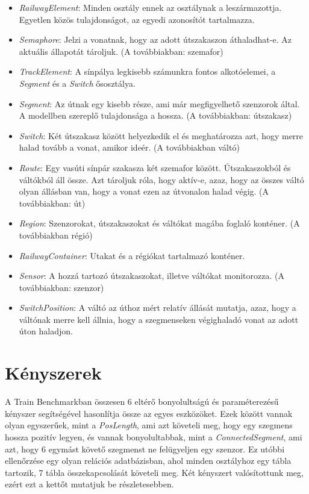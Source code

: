 \begin{itemize}
	\item \emph{RailwayElement}: Minden osztály ennek az osztálynak a leszármazottja. Egyetlen közös tulajdonságot, az egyedi azonosítót tartalmazza.
	\item \emph{Semaphore}: Jelzi a vonatnak, hogy az adott útszakaszon áthaladhat-e. Az aktuális állapotát tároljuk. (A továbbiakban: szemafor)
	\item \emph{TrackElement}: A sínpálya legkisebb számunkra fontos alkotóelemei, a \emph{Segment} és a \emph{Switch} ősosztálya.
	\item \emph{Segment}: Az útnak egy kisebb része, ami már megfigyelhető szenzorok által. A modellben szereplő tulajdonsága a hossza. (A továbbiakban: útszakasz)
	\item \emph{Switch}: Két útszakasz között helyezkedik el és meghatározza azt, hogy merre halad tovább a vonat, amikor ideér. (A továbbiakban váltó)
	\item \emph{Route}: Egy vasúti sínpár szakasza két szemafor között. Útszakaszokból és váltókból áll össze. Azt tároljuk róla, hogy aktív-e, azaz, hogy az összes váltó olyan állásban van, hogy a vonat ezen az útvonalon halad végig. (A továbbiakban: út)
	\item \emph{Region}: Szenzorokat, útszakaszokat és váltókat magába foglaló konténer. (A továbbiakban régió)
	\item \emph{RailwayContainer}: Utakat és a régiókat tartalmazó konténer.
	\item \emph{Sensor}: A hozzá tartozó útszakaszokat, illetve váltókat monitorozza. (A továbbiakban: szenzor)
	\item \emph{SwitchPosition}: A váltó az úthoz mért relatív állását mutatja, azaz, hogy a váltónak merre kell állnia, hogy a szegmenseken végighaladó vonat az adott úton haladjon. 
\end{itemize}

\section{Kényszerek}

A Train Benchmarkban összesen 6 eltérő bonyolultságú és paraméterezésű kényszer segítségével hasonlítja össze az egyes eszközöket. Ezek között vannak olyan egyszerűek, mint a \emph{PosLength}, ami azt követeli meg, hogy egy szegmens hossza pozitív legyen, és vannak bonyolultabbak, mint a \emph{ConnectedSegment}, ami azt, hogy 6 egymást követő szegmenst ne felügyeljen egy szenzor. Ez utóbbi ellenőrzése egy olyan relációs adatbázisban, ahol minden osztályhoz egy tábla tartozik, 7 tábla összekapcsolását követeli meg.
Két kényszert valósítottunk meg, ezért ezt a kettőt mutatjuk be részletesebben.

